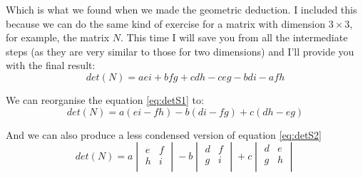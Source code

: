\documentclass[a4,12pt,twosided,openany]{memoir}
\begin{document}
Which is what we found when we made the geometric deduction. I included this because we can do the same kind of exercise for a matrix with dimension $3 \times 3$, for example, the matrix $N$. This time I will save you from all the intermediate steps (as they are very similar to those for two dimensions) and I’ll provide you with the final result:
\begin{equation}\label{eq:detS1}
det(N) = aei + bfg + cdh - ceg -bdi -afh
\end{equation}
\par 
\indent
We can reorganise the equation \ref{eq:detS1} to:
\begin{equation}\label{eq:detS2}
det(N) = a(ei-fh) - b(di-fg) + c(dh -eg)
\end{equation}
\par 
\indent
And we can also produce a less condensed version of equation \ref{eq:detS2}
\begin{equation}\label{eq:det}
det(N) =  a\begin{vmatrix}
e & f   \\
h & i \\ 
\end{vmatrix}  - b\begin{vmatrix}
d & f   \\
g & i \\
\end{vmatrix}    +  c\begin{vmatrix}
d & e   \\
g & h \\
\end{vmatrix}
\end{equation}
\newpage
\end{document}
